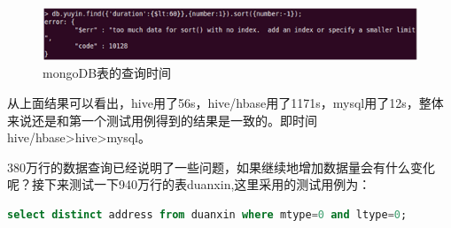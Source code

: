\begin{description}
\item
\begin{figure}[!ht]
\centering
\includegraphics[]{photo/djm4.png} 
\caption{mongoDB表的查询时间}
\end{figure} 

\end{description}
从上面结果可以看出，hive用了56s，hive/hbase用了1171s，mysql用了12s，整体来说还是和第一个测试用例得到的结果是一致的。即时间hive/hbase>hive>mysql。

380万行的数据查询已经说明了一些问题，如果继续地增加数据量会有什么变化呢？接下来测试一下940万行的表duanxin,这里采用的测试用例为：
\begin{lstlisting}[language=SQL]
select distinct address from duanxin where mtype=0 and ltype=0;
\end{lstlisting}


